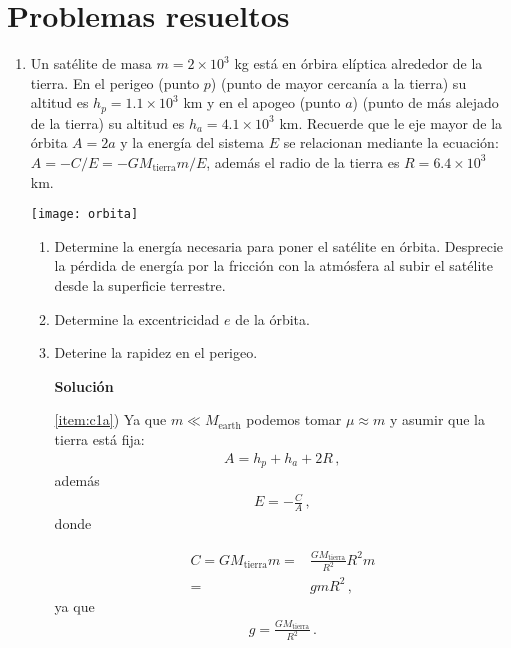 \section{Problemas resueltos}
\begin{enumerate}
\item Un satélite de masa $m=2 \times 10^3$ kg está en órbira elíptica alrededor de la tierra. En el perigeo (punto $p$) (punto de mayor cercanía a la tierra) su altitud es $h_p=1.1 \times 10^3$ km y en el apogeo (punto $a$) (punto de más alejado de la tierra) su altitud es $h_a=4.1 \times 10^3$ km. Recuerde que le eje mayor de la órbita $A=2a$ y la energía del sistema $E$ se relacionan mediante la ecuación: $A=-{C}/{E}=-{GM_{\text{tierra}}m}/{E}$, además el radio de la tierra es $R=6.4 \times 10^3$ km. 

  \begin{minipage}{0.45\linewidth}
    \texttt{[image: orbita]}
  \end{minipage}
  \begin{minipage}{0.55\linewidth}
    \begin{enumerate}
    \item Determine la energía necesaria para poner el satélite en órbita. Desprecie la pérdida de energía por la fricción con la atmósfera al subir el satélite desde la superficie terrestre.
      \label{item:c1a}
    \item Determine la excentricidad $e$ de la órbita.
      \label{item:c1b}
    \item Deterine la rapidez en el perigeo.
      \label{item:c1c}
    \end{enumerate}
  \end{minipage}

  \begin{itemize}
  \item[\textbf{Solución}]
  \item[\ref{item:c1a})] Ya que $m\ll M_{\text{earth}}$ podemos tomar $\mu\approx m$ y asumir que la tierra está fija:
    \begin{align*}
      A=h_p+h_a+2R\,,
    \end{align*}
    además   
    \begin{align*}
      E=-\frac{C}{A}\,,
    \end{align*}
    donde

    \begin{align*}
      C=GM_{\text{tierra}}m=&\frac{GM_{\text{tierra}}}{R^2}R^2 m\nonumber\\
      =&g m R^2\,,
    \end{align*}
    ya que
    \begin{align*}
      g=\frac{GM_{\text{tierra}}}{R^2}\,.
    \end{align*}


\end{itemize}
\end{enumerate}
